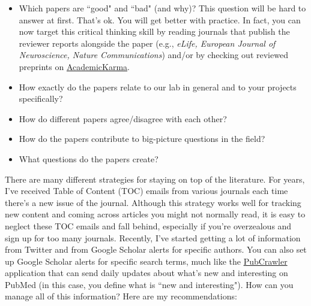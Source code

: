 \documentclass[letterpaper,12pt,oneside]{memoir}
\begin{document}
\begin{itemize}
\item Which papers are ``good" and ``bad" (and why)? This question will be hard to answer at first. That's ok. You will get better with practice. In fact, you can now target this critical thinking skill by reading journals that publish the reviewer reports alongside the paper (e.g., \textit{eLife, European Journal of Neuroscience, Nature Communications}) and/or by checking out reviewed preprints on \href{http://academickarma.org/}{AcademicKarma}.
\item How exactly do the papers relate to our lab in general and to your projects specifically?
\item How do different papers agree/disagree with each other?
\item How do the papers contribute to big-picture questions in the field? 
\item What questions do the papers create?  
\end{itemize}

There are many different strategies for staying on top of the literature. For years, I've received Table of Content (TOC) emails from various journals each time there's a new issue of the journal. Although this strategy works well for tracking new content and coming across articles you might not normally read, it is easy to neglect these TOC emails and fall behind, especially if you're overzealous and sign up for too many journals. Recently, I've started getting a lot of information from Twitter and from Google Scholar alerts for specific authors. You can also set up Google Scholar alerts for specific search terms, much like the \href{http://pubcrawler.gen.tcd.ie/}{PubCrawler} application that can send daily updates about what's new and interesting on PubMed (in this case, you define what is ``new and interesting"). How can you manage all of this information? Here are my recommendations:
\end{document}
